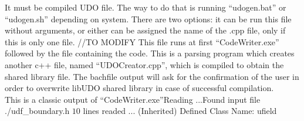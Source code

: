 \documentclass{article}     %
\begin{document}
It must be compiled UDO file. The way to do that is running “udogen.bat” or “udogen.sh” depending on system. There are two options: it can be run this file without arguments, or either can be assigned the name of the .cpp file, only if this is only one file. //TO MODIFY
This file runs at first “CodeWriter.exe” followed by the file containing the code. This is a parsing program which creates another c++ file, named “UDOCreator.cpp”, which is compiled to obtain the shared library file. The bachfile output will ask for the confirmation of the user in order to overwrite libUDO shared library in case of successful compilation.
\\
This is a classic output of “CodeWriter.exe”\newline
[I] Reading ...\newline
[I] Found input file ./udf\_boundary.h \newline
[I] $10$ lines readed ...\newline
(Inherited) Defined Class Name: ufield\newline
\end{document}
